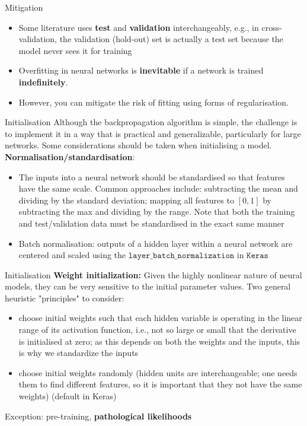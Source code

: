 \documentclass{beamer}
\begin{document}
\begin{frame}{Mitigation}
\begin{itemize}
\item Some literature uses \textbf{test} and \textbf{validation} interchangeably, e.g., in cross-validation, the validation (hold-out) set is actually a test set because the model never sees it for training
\item Overfitting in neural networks is \textbf{inevitable} if a network is trained \textbf{indefinitely}. 
\item However, you can mitigate the risk of fitting using forms of regularisation. 
\end{itemize}
\end{frame}
\begin{frame}{Initialisation}
Although the backpropagation algorithm is simple, the challenge is to implement it in a way that is practical and generalizable, particularly for large networks. Some considerations should be taken when initialising a model.\\

\textbf{Normalisation/standardisation}: 
\begin{itemize}
\item The inputs into a neural network should be standardised so that features have the same scale. Common approaches include: subtracting the mean and dividing by the standard deviation; mapping all features to $[0,1]$ by subtracting the max and dividing by the range. Note that both the training and test/validation data must be standardised in the exact same manner
\item Batch normalisation: outputs of a hidden layer within a neural network are centered and scaled using the $\texttt{layer\_batch\_normalization}$ in $\texttt{Keras}$
\end{itemize}
\end{frame}
\begin{frame}{Initialisation}
\textbf{Weight initialization:}
Given the highly nonlinear nature of neural models, they can be very sensitive to the initial parameter values. Two general heuristic "principles" to consider:
\begin{itemize}
\item choose initial weights such that each hidden variable is operating in the linear range of its activation function, i.e., not so large or small that the derivative is initialised at zero; as this depends on both the weights and the inputs, this is why we standardize the inputs
\item choose initial weights randomly (hidden units are interchangeable; one needs them to find different features, so it is important that they not have the same weights) (default in Keras)
\end{itemize}
Exception: pre-training, \textbf{pathological likelihoods}
\end{frame}
\end{document}
